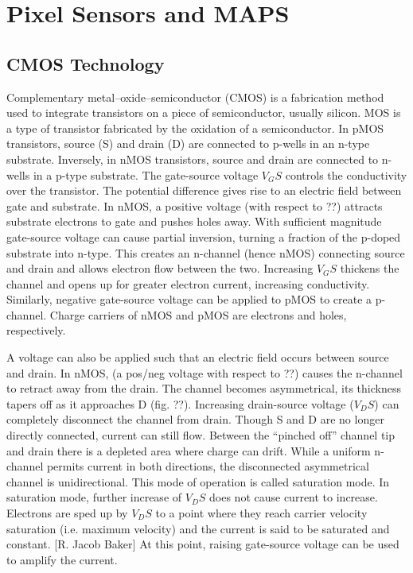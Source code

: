 \section{Pixel Sensors and MAPS}
\label{sec:PixelSens&MAPS}

\subsection{CMOS Technology}%

Complementary metal–oxide–semiconductor (CMOS) is a fabrication method used to integrate transistors on a piece of semiconductor, usually silicon. MOS is a type of transistor fabricated by the oxidation of a semiconductor. In pMOS transistors, source (S) and drain (D) are connected to p-wells in an n-type substrate. Inversely, in nMOS transistors, source and drain are connected to n-wells in a p-type substrate.
The gate-source voltage $V_GS$ controls the conductivity over the transistor. The potential difference gives rise to an electric field between gate and substrate.
In nMOS, a positive voltage (with respect to ??) attracts substrate electrons to gate and pushes holes away. With sufficient magnitude gate-source voltage can cause partial inversion, turning a fraction of the p-doped substrate into n-type. This creates an n-channel (hence nMOS) connecting source and drain and allows electron flow between the two. Increasing $V_GS$ thickens the channel and opens up for greater electron current, increasing conductivity. Similarly, negative gate-source voltage can be applied to pMOS to create a p-channel. Charge carriers of nMOS and pMOS are electrons and holes, respectively.

A voltage can also be applied such that an electric field occurs between source and drain. In nMOS, (a pos/neg voltage with respect to ??) causes the n-channel to retract away from the drain. The channel becomes asymmetrical, its thickness tapers off as it approaches D (fig. ??). Increasing drain-source voltage ($V_DS$) can completely disconnect the channel from drain. Though S and D are no longer directly connected, current can still flow. Between the “pinched off” channel tip and drain there is a depleted area where charge can drift. While a uniform n-channel permits current in both directions, the disconnected asymmetrical channel is unidirectional. This mode of operation is called saturation mode.
In saturation mode, further increase of $V_DS$ does not cause current to increase. Electrons are sped up by $V_DS$ to a point where they reach carrier velocity saturation (i.e. maximum velocity) and the current is said to be saturated and constant. [R. Jacob Baker] At this point, raising gate-source voltage can be used to amplify the current.

